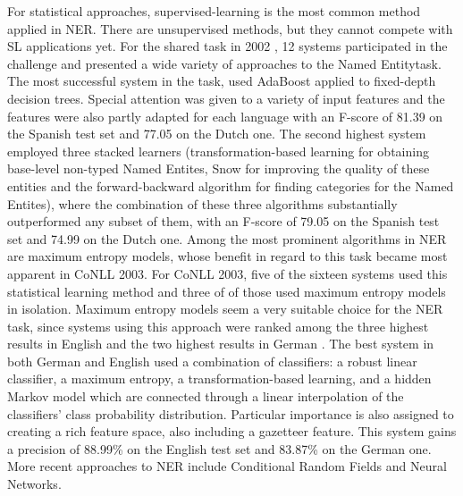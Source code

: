 \documentclass[11pt]{article}
\newcommand{\namedentity}{Named Entity}
\begin{document}
For statistical approaches, supervised-learning is the most common method applied in NER. 
There are unsupervised methods, but they cannot compete with SL applications yet.
For the shared task in 2002 \cite{tksintro}, 12 systems participated in the challenge and presented a wide variety of approaches to the \namedentity task.
The most successful system in the task, used AdaBoost applied to fixed-depth decision trees. Special attention was given to a variety of input features and the features were also
partly adapted for each language with an F-score of 81.39 on the Spanish test set and 77.05 on the Dutch one.
The second highest system \cite{Florian:2002:NER:1118853.1118863} employed three stacked
learners (transformation-based learning for obtaining base-level non-typed Named Entites, Snow for improving the quality of these entities and the forward-backward algorithm for
finding categories for the Named Entites), where the combination of these three algorithms substantially outperformed any subset of them, with an F-score of 79.05 on the Spanish test
set and 74.99 on the Dutch one.
Among the most prominent algorithms in NER are maximum entropy models, whose benefit in regard to this task became most apparent in CoNLL 2003. 
For CoNLL 2003, five of the sixteen systems used this statistical learning method and three of of those used maximum entropy models in isolation.
Maximum entropy models seem a very suitable choice for the NER task, since systems using this approach were ranked among the three highest results in 
English and the two highest results in German \cite{TjongKimSang:2003:ICS:1119176.1119195}.
The best system in both German and English \cite{Florian:2003:NER:1119176.1119201} used a combination of classifiers: a robust linear classifier, 
a maximum entropy, a transformation-based learning, and a hidden Markov model which are connected through a linear interpolation of the classifiers’ %
class probability distribution. Particular importance is also assigned to creating a rich feature space, also including a gazetteer feature. 
This system gains a precision of 88.99\% on the English test set and  83.87\% on the German one. 
More recent approaches to NER include Conditional Random Fields and Neural Networks.
\end{document}
